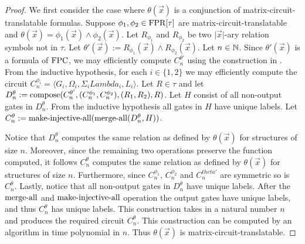 \documentclass[../paper.tex]{subfiles}
\begin{document}
\begin{proof}
  We first consider the case where $\theta(\vec{x})$ is a conjunction of
  matrix-circuit-translatable formulas. Suppose $\phi_1, \phi_2 \in \text{\upshape FPR}[\tau]$
  are matrix-circuit-translatable and $\theta (\vec{x}) = \phi_1(\vec{x}) \land
  \phi_2(\vec{x})$. Let $R_{\phi_1}$ and $R_{\phi_2}$ be two $\vert \vec{x}
  \vert$-ary relation symbols not in $\tau$. Let $\theta' (\vec{x}) :=
  R_{\phi_1}(\vec{x}) \land R_{\phi_2}(\vec{x})$. Let $n \in \mathbb{N}$. Since
  $\theta'(\vec{x})$ is a formula of $\text{\upshape FPC}$, we may efficiently compute
  $C^{\theta'}_n$ using the construction in \cite{AndersonD17}. From the
  inductive hypothesis, for each $i \in \{1,2\}$ we may efficiently compute the
  circuit $C^{\phi_i}_n = \langle G_i, \Omega_i, \Sigma_i Lambda_i, L_i
  \rangle$. Let $R \in \tau$ and let $D^{\theta}_n :=
  \text{\upshape compose}(C^{\theta'}_n, (C^{\phi_1}_n, C^{\phi_2}_n), (R_1, R_2), R)$. Let
  $H$ consist of all non-output gates in $D^{\theta}_n$. From the inductive
  hypothesis all gates in $H$ have unique labels. Let $C^{\theta}_n :=
  \text{\upshape make-injective-all}(\text{\upshape merge-all}(D^{\theta}_n, H))$.
  
  Notice that $D^{\theta}_n$ computes the same relation as defined by
  $\theta(\vec{x})$ for structures of size $n$. Moreover, since the remaining
  two operations preserve the function computed, it follows $C^{\theta}_n$
  computes the same relation as defined by $\theta(\vec{x})$ for structures of
  size $n$. Furthermore, since $C^{\phi_1}_n$, $C^{\phi_2}_n$ and $C^{theta'}_n$
  are symmetric so is $C^{\theta}_n$. Lastly, notice that all non-output gates
  in $D^{\theta}_n$ have unique labels. After the $\text{\upshape merge-all}$ and
  $\text{\upshape make-injective-all}$ operation the output gates have unique labels, and thus
  $C^{\theta}_n$ has unique labels. This construction takes in a natural number
  $n$ and produces the required circuit $C^{\theta}_n$. This construction can be
  computed by an algorithm in time polynomial in $n$. Thus $\theta(\vec{x})$ is
  matrix-circuit-translatable.



\end{proof}
\end{document}
